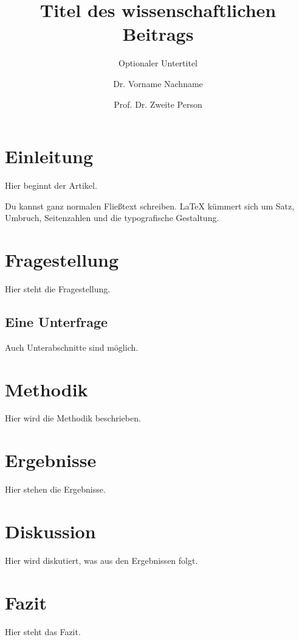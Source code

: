 \documentclass{aevidence}
\title{Titel des wissenschaftlichen Beitrags}
\subtitle{Optionaler Untertitel}
\author{
  Dr. Vorname Nachname
  \and
  Prof. Dr. Zweite Person
}
\begin{document}

\section{Einleitung}

Hier beginnt der Artikel.

Du kannst ganz normalen Fließtext schreiben. LaTeX kümmert sich um
Satz, Umbruch, Seitenzahlen und die typografische Gestaltung.

\section{Fragestellung}

Hier steht die Fragestellung.

\subsection{Eine Unterfrage}

Auch Unterabschnitte sind möglich.

\section{Methodik}

Hier wird die Methodik beschrieben.

\section{Ergebnisse}

Hier stehen die Ergebnisse.

\section{Diskussion}

Hier wird diskutiert, was aus den Ergebnissen folgt.

\section{Fazit}

Hier steht das Fazit.




%
%
\end{document}
